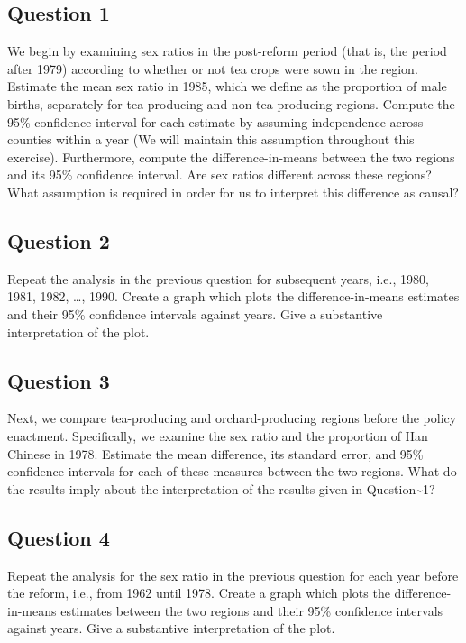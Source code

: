 \documentclass[]{article}
\begin{document}
\subsection{Question 1}\label{question-1}

We begin by examining sex ratios in the post-reform period (that is, the
period after 1979) according to whether or not tea crops were sown in
the region. Estimate the mean sex ratio in 1985, which we define as the
proportion of male births, separately for tea-producing and
non-tea-producing regions. Compute the 95\% confidence interval for each
estimate by assuming independence across counties within a year (We will
maintain this assumption throughout this exercise). Furthermore, compute
the difference-in-means between the two regions and its 95\% confidence
interval. Are sex ratios different across these regions? What assumption
is required in order for us to interpret this difference as causal?

\subsection{Question 2}\label{question-2}

Repeat the analysis in the previous question for subsequent years, i.e.,
1980, 1981, 1982, \ldots{}, 1990. Create a graph which plots the
difference-in-means estimates and their 95\% confidence intervals
against years. Give a substantive interpretation of the plot.

\subsection{Question 3}\label{question-3}

Next, we compare tea-producing and orchard-producing regions before the
policy enactment. Specifically, we examine the sex ratio and the
proportion of Han Chinese in 1978. Estimate the mean difference, its
standard error, and 95\% confidence intervals for each of these measures
between the two regions. What do the results imply about the
interpretation of the results given in Question\textasciitilde{}1?

\subsection{Question 4}\label{question-4}

Repeat the analysis for the sex ratio in the previous question for each
year before the reform, i.e., from 1962 until 1978. Create a graph which
plots the difference-in-means estimates between the two regions and
their 95\% confidence intervals against years. Give a substantive
interpretation of the plot.
\end{document}
